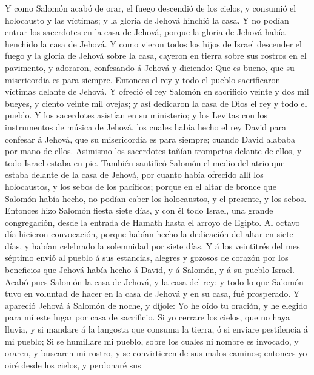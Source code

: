  Y como Salomón acabó de orar, el fuego descendió de los
cielos, y consumió el holocausto y las víctimas; y la gloria de Jehová
hinchió la casa.  Y no podían entrar los sacerdotes en la
casa de Jehová, porque la gloria de Jehová había henchido la casa de
Jehová.  Y como vieron todos los hijos de Israel descender
el fuego y la gloria de Jehová sobre la casa, cayeron en tierra sobre
sus rostros en el pavimento, y adoraron, confesando á Jehová y diciendo:
Que es bueno, que su misericordia es para siempre. 
Entonces el rey y todo el pueblo sacrificaron víctimas delante de
Jehová.  Y ofreció el rey Salomón en sacrificio veinte y
dos mil bueyes, y ciento veinte mil ovejas; y así dedicaron la casa de
Dios el rey y todo el pueblo.  Y los sacerdotes asistían
en su ministerio; y los Levitas con los instrumentos de música de
Jehová, los cuales había hecho el rey David para confesar á Jehová, que
su misericordia es para siempre; cuando David alababa por mano de ellos.
Asimismo los sacerdotes tañían trompetas delante de ellos, y todo Israel
estaba en pie.  También santificó Salomón el medio del
atrio que estaba delante de la casa de Jehová, por cuanto había ofrecido
allí los holocaustos, y los sebos de los pacíficos; porque en el altar
de bronce que Salomón había hecho, no podían caber los holocaustos, y el
presente, y los sebos.  Entonces hizo Salomón fiesta siete
días, y con él todo Israel, una grande congregación, desde la entrada de
Hamath hasta el arroyo de Egipto.  Al octavo día hicieron
convocación, porque habían hecho la dedicación del altar en siete días,
y habían celebrado la solemnidad por siete días.  Y á los
veintitrés del mes séptimo envió al pueblo á sus estancias, alegres y
gozosos de corazón por los beneficios que Jehová había hecho á David, y
á Salomón, y á su pueblo Israel.  Acabó pues Salomón la
casa de Jehová, y la casa del rey: y todo lo que Salomón tuvo en
voluntad de hacer en la casa de Jehová y en su casa, fué prosperado.
 Y apareció Jehová á Salomón de noche, y díjole: Yo he
oído tu oración, y he elegido para mí este lugar por casa de sacrificio.
 Si yo cerrare los cielos, que no haya lluvia, y si
mandare á la langosta que consuma la tierra, ó si enviare pestilencia á
mi pueblo;  Si se humillare mi pueblo, sobre los cuales
ni nombre es invocado, y oraren, y buscaren mi rostro, y se convirtieren
de sus malos caminos; entonces yo oiré desde los cielos, y perdonaré sus

